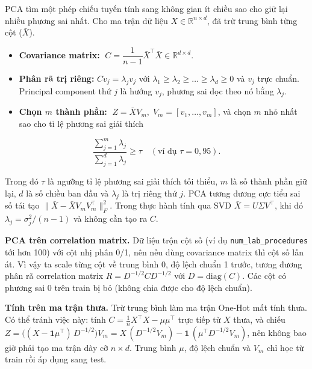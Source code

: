 \documentclass[a4paper]{report}
\begin{document}
PCA tìm một phép chiếu tuyến tính sang không gian ít chiều sao cho giữ lại nhiều phương sai nhất. Cho ma trận dữ liệu $X \in \mathbb{R}^{n \times d}$, đã trừ trung bình từng cột ($\bar{X}$).

\begin{itemize}
  \item \textbf{Covariance matrix:} $\;C = \dfrac{1}{n-1}\bar{X}^{\top}\bar{X} \in \mathbb{R}^{d\times d}$.
  \item \textbf{Phân rã trị riêng:} $C v_j = \lambda_j v_j$ với $\lambda_1 \ge \lambda_2 \ge \dots \ge \lambda_d \ge 0$ và $v_j$ trực chuẩn. Principal component thứ $j$ là hướng $v_j$, phương sai dọc theo nó bằng $\lambda_j$.
  \item \textbf{Chọn $m$ thành phần:} $\;Z = \bar{X} V_m,\; V_m = [v_1,\dots,v_m]$, và chọn $m$ nhỏ nhất sao cho tỉ lệ phương sai giải thích
\end{itemize}

\begin{equation}
  \frac{\sum_{j=1}^{m}\lambda_j}{\sum_{j=1}^{d}\lambda_j} \ge \tau \quad(\text{ví dụ } \tau = 0{,}95).
\end{equation}

Trong đó $\tau$ là ngưỡng tỉ lệ phương sai giải thích tối thiểu, $m$ là số thành phần giữ lại, $d$ là số chiều ban đầu và $\lambda_j$ là trị riêng thứ $j$. PCA tương đương cực tiểu sai số tái tạo $\lVert \bar{X} - \bar{X}V_mV_m^{\top}\rVert_F^2$. Trong thực hành tính qua SVD $\bar{X} = U\Sigma V^{\top}$, khi đó $\lambda_j = \sigma_j^2/(n-1)$ và không cần tạo ra $C$.

\textbf{PCA trên correlation matrix.} Dữ liệu trộn cột số (ví dụ \texttt{num\_\allowbreak{}lab\_\allowbreak{}procedures} tới hơn 100) với cột nhị phân 0/1, nên nếu dùng covariance matrix thì cột số lấn át. Vì vậy ta scale từng cột về trung bình 0, độ lệch chuẩn 1 trước, tương đương phân rã correlation matrix $R = D^{-1/2} C D^{-1/2}$ với $D = \mathrm{diag}(C)$. Các cột có phương sai 0 trên train bị bỏ (không chia được cho độ lệch chuẩn).

\textbf{Tính trên ma trận thưa.} Trừ trung bình làm ma trận One-Hot mất tính thưa. Có thể tránh việc này: tính $C = \frac{1}{n}X^{\top}X - \mu\mu^{\top}$ trực tiếp từ $X$ thưa, và chiếu $Z = \big((X - \mathbf{1}\mu^{\top})\,D^{-1/2}\big)V_m = X\,(D^{-1/2}V_m) - \mathbf{1}\,(\mu^{\top}D^{-1/2}V_m)$, nên không bao giờ phải tạo ma trận dày cỡ $n \times d$. Trung bình $\mu$, độ lệch chuẩn và $V_m$ chỉ học từ train rồi áp dụng sang test.
\end{document}
